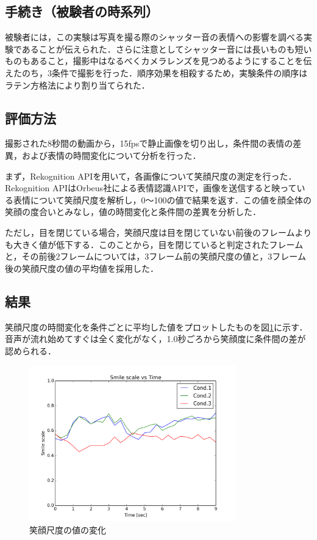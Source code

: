 \documentclass[submit,techreq]{ec2014}
\begin{document}
\subsection{手続き（被験者の時系列）}

被験者には，この実験は写真を撮る際のシャッター音の表情への影響を調べる実験であることが伝えられた．さらに注意としてシャッター音には長いものも短いものもあること，撮影中はなるべくカメラレンズを見つめるようにすることを伝えたのち，3条件で撮影を行った．順序効果を相殺するため，実験条件の順序はラテン方格法により割り当てられた．

\subsection{評価方法}

撮影された8秒間の動画から，15fpsで静止画像を切り出し，条件間の表情の差異，および表情の時間変化について分析を行った．

まず，Rekognition APIを用いて，各画像について笑顔尺度の測定を行った．Rekognition APIはOrbeus社による表情認識APIで，画像を送信すると映っている表情について笑顔尺度を解析し，0〜100の値で結果を返す．この値を顔全体の笑顔の度合いとみなし，値の時間変化と条件間の差異を分析した．

ただし，目を閉じている場合，笑顔尺度は目を閉じていない前後のフレームよりも大きく値が低下する．このことから，目を閉じていると判定されたフレームと，その前後2フレームについては，3フレーム前の笑顔尺度の値と，3フレーム後の笑顔尺度の値の平均値を採用した．

\subsection{結果}

笑顔尺度の時間変化を条件ごとに平均した値をプロットしたものを図\ref{graph-smooth}に示す．音声が流れ始めてすぐは全く変化がなく，1.0秒ごろから笑顔度に条件間の差が認められる．

\begin{figure}[h!]
  \centering  
\includegraphics[width=90mm, bb=0 0 600 450]{images/smooth5_avg.png}
\caption{笑顔尺度の値の変化}
  \label{graph-smooth}
\end{figure}
\end{document}
